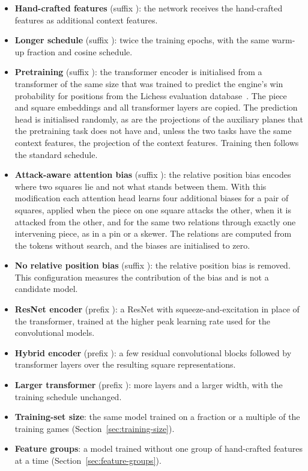 \begin{itemize}
\ifchangehand
\item \textbf{Hand-crafted features} (suffix ): the network
receives the hand-crafted features as additional context features.
\fi
\ifchangeepochs
\item \textbf{Longer schedule} (suffix ): twice the training
epochs, with the same warm-up fraction and cosine schedule.
\fi
\ifchangestart
\item \textbf{Pretraining} (suffix ): the transformer
encoder is initialised from a transformer of the same size that was trained
to predict the engine's win probability for positions from the Lichess
evaluation database~\cite{lichessdb}. The piece and square embeddings and all
transformer layers are copied. The prediction head is initialised randomly,
as are the projections of the auxiliary planes that the pretraining task does
not have and, unless the two tasks have the same context features, the
projection of the context features. Training then follows the standard
schedule.
\fi
\ifchangeattacks
\item \textbf{Attack-aware attention bias} (suffix ): the
relative position bias encodes where two squares lie and not what stands
between them. With this modification each attention head learns four
additional biases for a pair of squares, applied when the piece on one square
attacks the other, when it is attacked from the other, and for the same two
relations through exactly one intervening piece, as in a pin or a skewer. The
relations are computed from the tokens without search, and the biases are
initialised to zero.
\fi
\ifchangegeometry
\item \textbf{No relative position bias} (suffix ): the
relative position bias is removed. This configuration measures the
contribution of the bias and is not a candidate model.
\fi
\ifchangeconv
\item \textbf{ResNet encoder} (prefix ): a ResNet with
squeeze-and-excitation in place of the transformer, trained at the higher
peak learning rate used for the convolutional models.
\fi
\ifchangehybrid
\item \textbf{Hybrid encoder} (prefix ): a few residual
convolutional blocks followed by transformer layers over the resulting
square representations.
\fi
\ifchangelarger
\item \textbf{Larger transformer} (prefix ): more layers and
a larger width, with the training schedule unchanged.
\fi
\ifgames
\item \textbf{Training-set size}: the same model trained on a fraction or a
multiple of the training games (Section~\ref{sec:training-size}).
\fi
\iffeatures
\item \textbf{Feature groups}: a model trained without one group of
hand-crafted features at a time (Section~\ref{sec:feature-groups}).
\fi
\end{itemize}

